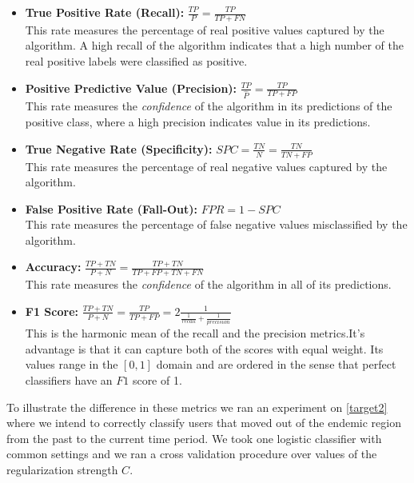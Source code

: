 \begin{itemize}
\item \textbf{True Positive Rate (Recall):} $\frac{TP}{P} = \frac{TP}{TP + FN}$ \\ This rate measures the percentage of real positive values captured by the algorithm.
A high recall of the algorithm indicates that a high number of the real positive labels were classified as positive.


\item \textbf{Positive Predictive Value (Precision):} $\frac{TP}{\hat{P}} = \frac{TP}{TP + FP}$ \\ This rate measures the \textit{confidence} of the algorithm in its predictions of the positive class, where a high precision indicates value in its predictions.

\item \textbf{True Negative Rate (Specificity):} $ SPC = \frac{TN}{N} = \frac{TN}{TN + FP}$ \\ This rate measures the percentage of real negative values captured by the algorithm.


\item \textbf{False Positive Rate (Fall-Out):} $FPR = 1 - SPC$ \\ This rate measures the percentage of false negative values misclassified by the algorithm.

\item \textbf{Accuracy:} $\frac{TP + TN}{P + N} = \frac{TP + TN}{TP + FP + TN + FN}$ \\ This rate measures the \textit{confidence} of the algorithm in all of its predictions.


\item \textbf{F1 Score:} $\frac{TP + TN}{P + N} = \frac{TP}{TP + FP} = 2 \frac{1}{ \frac{1}{recall} + \frac{1}{precision} }$ \\ This is the harmonic mean of the recall and the precision metrics.\@ It's advantage is that it can capture both of the scores with equal weight.
Its values range in the ${[0,1 ]}$ domain and are ordered in the sense that perfect classifiers have an $F1$ score of 1.

\end{itemize}


To illustrate the difference in these metrics we ran an experiment on \cref{target2} where we intend to correctly classify users that moved out of the endemic region from the past to the current time period.
We took one logistic classifier with common settings and we ran a cross validation procedure over values of the regularization strength $C$.

